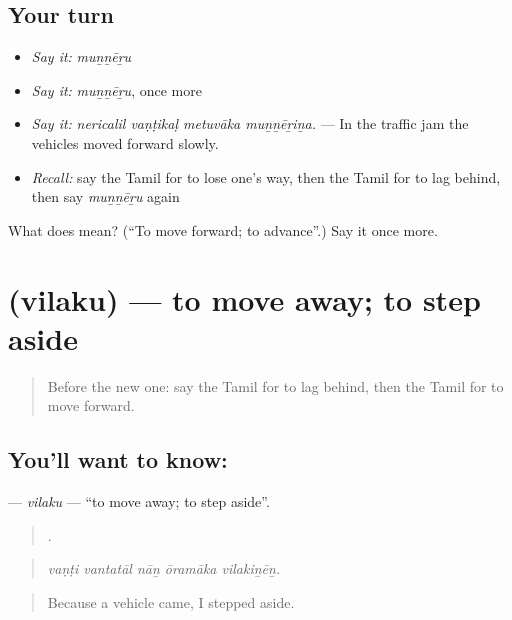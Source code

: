 \subsection*{Your turn}
\begin{itemize}
\raggedright
  \item \emph{Say it:} \emph{muṉṉēṟu}
  \item \emph{Say it:} \emph{muṉṉēṟu}, once more
  \item \emph{Say it:} \emph{nericalil vaṇṭikaḷ metuvāka muṉṉēṟiṉa.} — In the traffic jam the vehicles moved forward slowly.
  \item \emph{Recall:} say the Tamil for to lose one's way, then the Tamil for to lag behind, then say \emph{muṉṉēṟu} again
\end{itemize}

\begin{tcolorbox}[breakable,colback=teal!4,colframe=teal!35!black,title={Before you move on}]
What does  mean? (\textquotedblleft{}To move forward; to advance\textquotedblright{}.) Say it once more.
\end{tcolorbox}
\section[\texorpdfstring{\ta{விலகு} (vilaku)}{விலகு (vilaku)}]{ (vilaku) — to move away; to step aside}

\label{lesson:TA-C412-vilaku}



\begin{quote}
Before the new one: say the Tamil for to lag behind, then the Tamil for to move forward.
\end{quote}

\subsection*{You'll want to know: }
\textbf{} — \emph{vilaku} — \textquotedblleft{}to move away; to step aside\textquotedblright{}.

\begin{quote}
    .
\end{quote}

\begin{quote}
\emph{vaṇṭi vantatāl nāṉ ōramāka vilakiṉēṉ.}
\end{quote}

\begin{quote}
Because a vehicle came, I stepped aside.
\end{quote}

